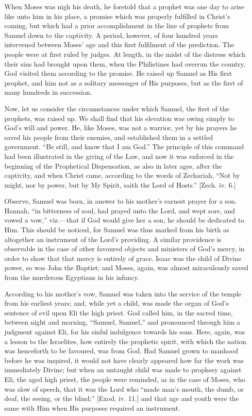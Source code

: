 When Moses was nigh his death, he foretold that a prophet was one
day to arise like unto him in his place, a promise which was properly
fulfilled in Christ's coming, but which had a prior accomplishment
in the line of prophets from Samuel down to the captivity. A period,
however, of four hundred years intervened between Moses' age and
this first fulfilment of the prediction. The people were at first
ruled by judges. At length, in the midst of the distress which their
sins had brought upon them, when the Philistines had overrun the
country, God visited them according to the promise. He raised up
Samuel as His first prophet, and him not as a solitary messenger of
His purposes, but as the first of many hundreds in succession.

Now, let us consider the circumstances under which Samuel, the
first of the prophets, was raised up. We shall find that his elevation
was owing simply to God's will and power. He, like Moses, was not a
warrior, yet by his prayers he saved his people from their enemies,
and established them in a settled government. ``Be still, and know
that I am God.'' The principle of this command had been
illustrated in the giving of the Law, and now it was enforced in the
beginning of the Prophetical Dispensation, as also in later ages,
after the captivity, and when Christ came, according to the words of
Zechariah, ``Not by might, nor by power, but by My Spirit, saith
the Lord of Hosts.'' [Zech. iv. 6.]

Observe, Samuel was born, in answer to his mother's earnest
prayer for a son. Hannah, ``in bitterness of soul, had prayed unto
the Lord, and wept sore, and vowed a vow,'' viz.—that if God
would give her a son, he should be dedicated to Him. This should be
noticed, for Samuel was thus marked from his birth as altogether an
instrument of the Lord's providing. A similar providence is
observable in the case of other favoured objects and ministers of God's
mercy, in order to show that that mercy is entirely of grace. Isaac
was the child of Divine power, so was John the Baptist; and Moses,
again, was almost miraculously saved from the murderous Egyptians in
his infancy.

According to his mother's vow, Samuel was taken into the service
of the temple from his earliest years; and, while yet a child, was
made the organ of God's sentence of evil upon Eli the high priest.
God called him, in the sacred time, between night and morning,
``Samuel, Samuel,'' and pronounced through him a judgment
against Eli, for his sinful indulgence towards his sons. Here, again,
was a lesson to the Israelites, how entirely the prophetic spirit,
with which the nation was henceforth to be favoured, was from God. Had
Samuel grown to manhood before he was inspired, it would not have
clearly appeared how far the work was immediately Divine; but when an
untaught child was made to prophesy against Eli, the aged high priest,
the people were reminded, as in the case of Moses, who was slow of
speech, that it was the Lord who ``made man's mouth, the dumb,
or deaf, the seeing, or the blind;'' [Exod. iv. 11.] and that age
and youth were the same with Him when His purposes required an
instrument.

